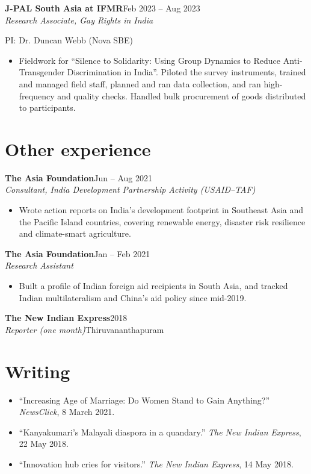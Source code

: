 \documentclass[11pt,a4paper]{article}
\newcommand{\entry}[4]{\noindent\textbf{#1}\hfill #2\\ \textit{#3}\hfill #4\par}
\begin{document}
\vspace{4pt}
\entry{J-PAL South Asia at IFMR}{Feb 2023 -- Aug 2023}{Research Associate, Gay Rights in India}{}
PI: Dr. Duncan Webb (Nova SBE)\par
\begin{itemize}
  \item Fieldwork for ``Silence to Solidarity: Using Group Dynamics to Reduce Anti-Transgender Discrimination in India''. Piloted the survey instruments, trained and managed field staff, planned and ran data collection, and ran high-frequency and quality checks. Handled bulk procurement of goods distributed to participants.
\end{itemize}

\section{Other experience}
\entry{The Asia Foundation}{Jun -- Aug 2021}{Consultant, India Development Partnership Activity (USAID--TAF)}{}
\begin{itemize}
  \item Wrote action reports on India's development footprint in Southeast Asia and the Pacific Island countries, covering renewable energy, disaster risk resilience and climate-smart agriculture.
\end{itemize}
\entry{The Asia Foundation}{Jan -- Feb 2021}{Research Assistant}{}
\begin{itemize}
  \item Built a profile of Indian foreign aid recipients in South Asia, and tracked Indian multilateralism and China's aid policy since mid-2019.
\end{itemize}
\entry{The New Indian Express}{2018}{Reporter (one month)}{Thiruvananthapuram}

\section{Writing}
\begin{itemize}
  \item ``Increasing Age of Marriage: Do Women Stand to Gain Anything?'' \textit{NewsClick}, 8 March 2021.
  \item ``Kanyakumari's Malayali diaspora in a quandary.'' \textit{The New Indian Express}, 22 May 2018.
  \item ``Innovation hub cries for visitors.'' \textit{The New Indian Express}, 14 May 2018.
\end{itemize}
\end{document}
